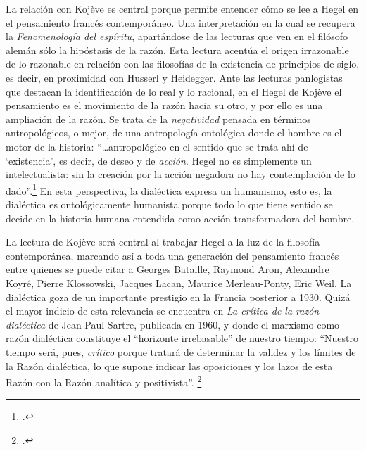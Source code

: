 La relación con Kojève es central porque permite entender cómo se lee a Hegel en el pensamiento francés contemporáneo. Una interpretación en la cual se recupera la \emph{Fenomenología del espíritu}, apartándose de las lecturas que ven en el filósofo alemán sólo la hipóstasis de la razón. Esta lectura acentúa el origen irrazonable de lo razonable en relación con las filosofías de la existencia de principios de siglo, es decir, en proximidad con Husserl y Heidegger. Ante las lecturas panlogistas que destacan la identificación de lo real y lo racional, en el Hegel de Kojève el pensamiento es el movimiento de la razón hacia su otro, y por ello es una ampliación de la razón. Se trata de la \emph{negatividad} pensada en términos antropológicos, o mejor, de una antropología ontológica donde el hombre es el motor de la historia: \enquote{\ldots antropológico en el sentido que se trata ahí de \enquote{existencia}, es decir, de deseo y de \emph{acción}. Hegel no es simplemente un intelectualista: sin la creación por la acción negadora no hay contemplación de lo dado}.\footcite[53]{@6963-KOJEVE1996} En esta perspectiva, la dialéctica expresa un humanismo, esto es, la dialéctica es ontológicamente humanista porque todo lo que tiene sentido se decide en la historia humana entendida como acción transformadora del hombre.

La lectura de Kojève será central al trabajar Hegel a la luz de la filosofía contemporánea, marcando así a toda una generación del pensamiento francés entre quienes se puede citar a Georges Bataille, Raymond Aron, Alexandre Koyré, Pierre Klossowski, Jacques Lacan, Maurice Merleau-Ponty, Eric Weil. La dialéctica goza de un importante prestigio en la Francia posterior a 1930. Quizá el mayor indicio de esta relevancia se encuentra en \emph{La crítica de la razón dialéctica} de Jean Paul Sartre, publicada en 1960, y donde el marxismo como razón dialéctica constituye el \enquote{horizonte irrebasable} de nuestro tiempo: \enquote{Nuestro tiempo será, pues, \emph{crítico} porque tratará de determinar la validez y los límites de la Razón dialéctica, lo que supone indicar las oposiciones y los lazos de esta Razón con la Razón analítica y positivista}. \footcite[11]{@6964-SARTRE1995}

